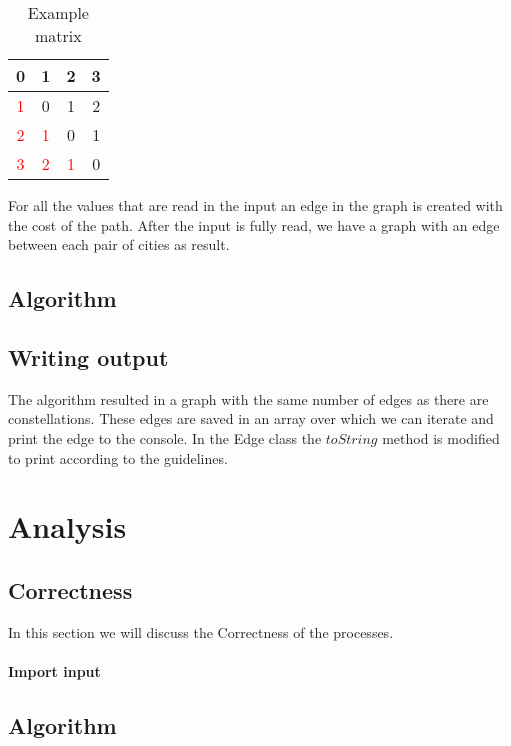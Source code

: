 \documentclass{article}
\newcommand{\textHighlight}[1]{\textcolor{red}{#1}}
\begin{document}
\begin{table}[h]
  \begin{center}
    \begin{tabular}{c | c | c | c}
      0 & 1 & 2 & 3 \\ \hline
      \textHighlight{1} & 0 & 1 & 2 \\ \hline
      \textHighlight{2} & \textHighlight{1} & 0 & 1 \\ \hline
      \textHighlight{3} & \textHighlight{2} & \textHighlight{1} & 0
    \end{tabular}
    \caption{Example matrix} \label{table:T1}
  \end{center}
\end{table}
\vspace{-0,5cm}
For all the values that are read in the input an edge in the graph is created with the cost of the path. After the input is fully read, we have a graph with an edge between each pair of cities as result.

\subsection{Algorithm}
\subsection{Writing output}
The algorithm resulted in a graph with the same number of edges as there are constellations. These edges are saved in an array over which we can iterate and print the edge to the console. In the Edge class the $toString$ method is modified to print according to the guidelines.

\newpage
\section{Analysis}

\subsection{Correctness}
In this section we will discuss the Correctness of the processes.

\paragraph{Import input}
\subsection{Algorithm}
\end{document}
